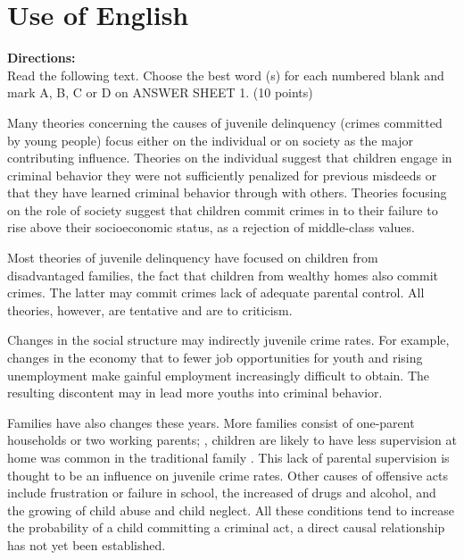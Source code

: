 

\section{Use of English}

\noindent
\textbf{Directions:}\\
Read the following text. Choose the best word (s) for each numbered blank
and mark A, B, C or D on ANSWER SHEET 1. (10 points)


\TiGanSpace


Many theories concerning the causes of juvenile delinquency (crimes
committed by young people) focus either on the individual or on society
as the major contributing influence. Theories \cloze on the
individual suggest that children engage in criminal behavior
\cloze they were not sufficiently penalized for previous misdeeds
or that they have learned criminal behavior through \cloze with
others. Theories focusing on the role of society suggest that children
commit crimes in \cloze to their failure to rise above their
socioeconomic status, \cloze as a rejection of middle-class
values.

Most theories of juvenile delinquency have focused on children from
disadvantaged families, \cloze the fact that children from
wealthy homes also commit crimes. The latter may commit crimes
\cloze lack of adequate parental control. All theories, however,
are tentative and are \cloze to criticism.

Changes in the social structure may indirectly \cloze juvenile
crime rates. For example, changes in the economy that \cloze to
fewer job opportunities for youth and rising unemployment \cloze
make gainful employment increasingly difficult to obtain. The resulting
discontent may in \cloze lead more youths into criminal
behavior.

Families have also \cloze changes these years. More families
consist of one-parent households or two working parents; \cloze , children are likely to have less supervision at home \cloze
was common in the traditional family \cloze. This lack of
parental supervision is thought to be an influence on juvenile crime
rates. Other \cloze causes of offensive acts include
frustration or failure in school, the increased \cloze
of drugs and alcohol, and the growing \cloze of child abuse and
child neglect. All these conditions tend to increase the probability of
a child committing a criminal act, \cloze a direct causal
relationship has not yet been established.


